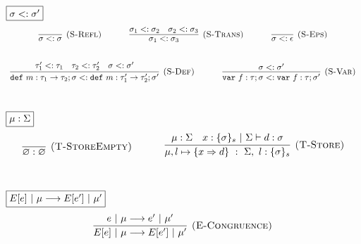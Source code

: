 \documentclass{llncs}
\newcommand{\keywadj}[1]{\mathtt{#1}}
\newcommand{\keyw}[1]{\keywadj{#1}~}
\begin{document}
$\fbox{$\sigma <: \sigma'$}$
\[
\begin{array}{c}
\infer[\textsc{(S-Refl)}]
  {\sigma <: \sigma}
  {}%
~~~~~~~~~~
\infer[\textsc{(S-Trans)}]
  {\sigma_1 <: \sigma_3}
  {\sigma_1 <: \sigma_2 & \sigma_2 <: \sigma_3}%
~~~~~~~~~~
\infer[\textsc{(S-Eps)}]
  {\sigma <: \epsilon}
  {}\\[5ex]

\infer[\textsc{(S-Def)}]
  {\keyw{def} m:\tau_1 \rightarrow \tau_2; \sigma <: \keyw{def} m:\tau_1' \rightarrow \tau_2'; \sigma'}
  {\tau_1' <: \tau_1 & \tau_2 <: \tau_2' & \sigma <: \sigma'}%
~~~~~~~~~~
\infer[\textsc{(S-Var)}]
  {\keyw{var} f:\tau; \sigma <: \keyw{var} f:\tau; \sigma'}
  {\sigma <: \sigma'}\\[5ex]  

\end{array}
\]

$\fbox{$\mu : \Sigma$}$
\[
\begin{array}{c}

\infer[\textsc{(T-StoreEmpty)}]
  {\varnothing : \varnothing}
  {}%
~~~~~~~~~~
\infer[\textsc{(T-Store)}]
  {\mu, l \mapsto \{ x \Rightarrow d \}~:~\Sigma,~l : \{ \sigma \}_s}
  {\mu : \Sigma & x : \{ \sigma \}_s~|~\Sigma \vdash d : \sigma}\\[5ex]

\end{array}
\]

$\fbox{$E[e]~|~\mu \longrightarrow E[e']~|~\mu'$}$
\[
\begin{array}{c}
\infer[\textsc{(E-Congruence)}]
  {E[e]~|~\mu \longrightarrow E[e']~|~\mu'}
  {e~|~\mu \longrightarrow e'~|~\mu'}\\[5ex]  
\end{array}
\]
\end{document}
